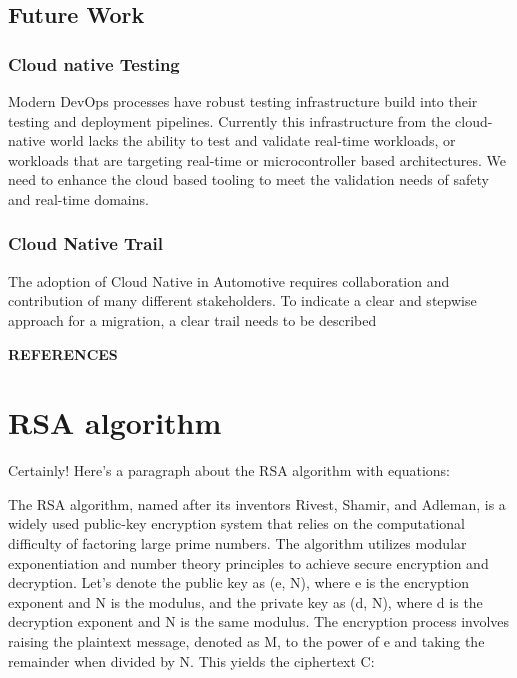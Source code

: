 \documentclass[
12pt,
oneside, 
onehalfspacing, 
nolistspacing, 
parskip, 
chapterinoneline, 
]{AASTCOMPUTER}
\begin{document}
\section{Future Work}
\subsection{Cloud native Testing}
Modern DevOps processes have robust testing infrastructure build into their testing and deployment pipelines. Currently this infrastructure from the cloud-native world lacks the ability to test and validate real-time workloads, or workloads that are targeting real-time or microcontroller based architectures. We need to enhance the cloud based tooling to meet the validation needs of safety and real-time domains.
\subsection{Cloud Native Trail}
The adoption of Cloud Native in Automotive requires collaboration and contribution of many different stakeholders. To indicate a clear and stepwise approach for a migration, a clear trail needs to be described 

\newpage
{} 
{}  
\begin{center}{\Large\MakeUppercase{\textbf{References}}\par}\end{center}
\vspace{20pt}
\printbibliography[heading=none]

\appendixstart 
\chapter{RSA algorithm}
Certainly! Here's a paragraph about the RSA algorithm with equations:

The RSA algorithm, named after its inventors Rivest, Shamir, and Adleman, is a widely used public-key encryption system that relies on the computational difficulty of factoring large prime numbers. The algorithm utilizes modular exponentiation and number theory principles to achieve secure encryption and decryption. Let's denote the public key as (e, N), where e is the encryption exponent and N is the modulus, and the private key as (d, N), where d is the decryption exponent and N is the same modulus. The encryption process involves raising the plaintext message, denoted as M, to the power of e and taking the remainder when divided by N. This yields the ciphertext C:
\end{document}
